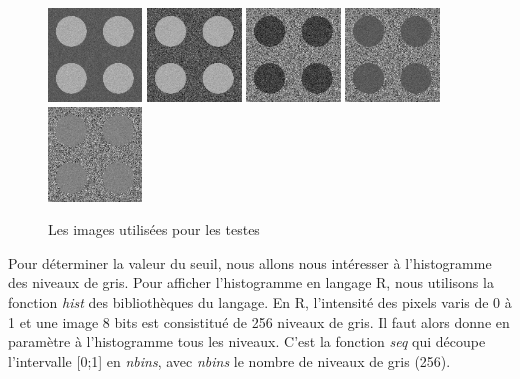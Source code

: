 \documentclass[11pt]{article}
\begin{document}
  \begin{figure}[H]
    \center
    \includegraphics[width=2.5cm]{texture-0/texture-0.png}
    \includegraphics[width=2.5cm]{texture-1/texture-1.png}
    \includegraphics[width=2.5cm]{texture-2/texture-2.png}
    \includegraphics[width=2.5cm]{texture-3/texture-3.png}
    \includegraphics[width=2.5cm]{texture-4/texture-4.png}
    \caption{Les images utilisées pour les testes}
  \end{figure}
  
  Pour déterminer la valeur du seuil, nous allons nous intéresser à l'histogramme des niveaux de gris. Pour 
  afficher l'histogramme en langage R, nous utilisons la fonction \textit{hist} des bibliothèques du langage.
  En R, l'intensité des pixels varis de 0 à 1 et une image 8 bits est consistitué de 256 niveaux de gris.
  Il faut alors donne en paramètre à l'histogramme tous les niveaux. C'est la fonction \textit{seq} qui
  découpe l'intervalle [0;1] en \textit{nbins}, avec \textit{nbins} le nombre de niveaux de gris (256).\\
  
  \newpage
  
\end{document}
